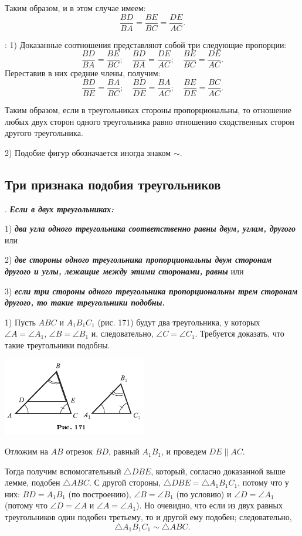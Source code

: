 \documentclass[oneside]{book}
\begin{document}
Таким образом, и в этом случае имеем:
\[\frac{BD}{BA}=\frac{BE}{BC}=\frac{DE}{AC}.\]


:
1) Доказанные соотношения представляют собой три следующие пропорции:
\[\frac{BD}{BA}=\frac{BE}{BC};
\quad
\frac{BD}{BA}=\frac{DE}{AC};
\quad
\frac{BE}{BC}=\frac{DE}{AC}.\]
Переставив в них средние члены, получим:
\[\frac{BD}{BE}=\frac{BA}{BC};
\quad
\frac{BD}{DE}=\frac{BA}{AC};
\quad
\frac{BE}{DE}=\frac{BC}{AC}.\]

Таким образом, если в треугольниках стороны пропорциональны, то отношение любых двух сторон одного треугольника равно отношению сходственных сторон другого треугольника.

2) Подобие фигур обозначается иногда знаком $\sim$.

\subsection*{Три признака подобия треугольников}

.
\textbf{\emph{Если в двух треугольниках:}}

1) \textbf{\emph{два угла одного треугольника соответственно равны двум, углам, другого}} или

2) \textbf{\emph{две стороны одного треугольника пропорциональны двум сторонам другого и углы, лежащие между этими сторонами, равны}} или

3) \textbf{\emph{если три стороны одного треугольника пропорциональны трем сторонам другого, то такие треугольники подобны.}}

1) Пусть $ABC$ и $A_1B_1C_1$ (рис. 171) будут два треугольника, у которых $\angle A = \angle A_1$, $\angle B=\angle B_1$ и, следовательно, $\angle C=\angle C_1$.
Требуется доказать, что такие треугольники подобны.

\includegraphics{pics/ris-171}

Отложим на $AB$ отрезок $BD$, равный $A_1B_1$, и проведем $DE\parallel AC$.

Тогда получим вспомогательный $\triangle DBE$, который, согласно доказанной выше лемме, подобен $\triangle ABC$.
С другой стороны, $\triangle DBE= \triangle A_1B_1C_1$, потому что у них:
$BD=A_1B_1$ (по построению), $\angle B=\angle B_1$ (по условию) и $\angle D = \angle A_1$ (потому что $\angle D = \angle A$ и $\angle A = \angle A_1$).
Но очевидно, что если из двух равных треугольников один подобен третьему, то и другой ему подобен;
следовательно, 
\[\triangle A_1B_1C_1\sim\triangle ABC.\]
\end{document}
